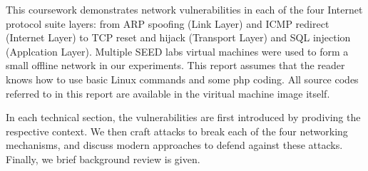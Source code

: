 This coursework demonstrates network vulnerabilities in each of the four Internet protocol suite layers: from  ARP spoofing (Link Layer) and ICMP redirect (Internet Layer) to TCP reset and hijack (Transport Layer) and SQL injection (Applcation Layer). Multiple SEED labs virtual machines were used to form a small offline network in our experiments. This report assumes that the reader knows how to use basic Linux commands and some php coding. All source codes referred to in this report are available in the viritual machine image itself.

In each technical section, the vulnerabilities are first introduced by prodiving the respective context. We then craft attacks to break each of the four networking mechanisms, and discuss modern approaches to defend against these attacks. Finally, we brief background review is given.